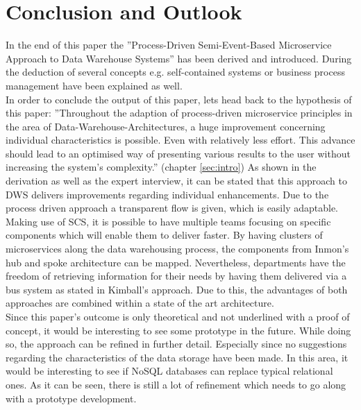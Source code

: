 \section{Conclusion and Outlook}
\label{sec:conclusion}
In the end of this paper the ''Process-Driven Semi-Event-Based Microservice Approach to Data Warehouse Systems'' has been derived and introduced. During the deduction of several concepts e.g. self-contained systems or business process management have been explained as well. \newline
\\
In order to conclude the output of this paper, lets head back to the hypothesis of this paper: ''Throughout the adaption of process-driven  microservice  principles  in  the  area  of  Data-Warehouse-Architectures,  a  huge improvement concerning individual characteristics is possible. Even with relatively less effort. This advance should lead to an optimised way of presenting various results to the user without increasing the system's complexity.'' (chapter \ref{sec:intro})
As shown in the derivation as well as the expert interview, it can be stated that this approach to DWS delivers improvements regarding individual enhancements. Due to the process driven approach a transparent flow is given, which is easily adaptable. Making use of SCS, it is possible to have multiple teams focusing on specific components which will enable them to deliver faster. By having clusters of microservices along the data warehousing process, the components from Inmon's hub and spoke architecture can be mapped. Nevertheless, departments have the freedom of retrieving information for their needs by having them delivered via a bus system as stated in Kimball's approach.\newline
Due to this, the advantages of both approaches are combined within a state of the art architecture. \newline
\\
Since this paper's outcome is only theoretical and not underlined with a proof of concept, it would be interesting to see some prototype in the future. While doing so, the approach can be refined in further detail. Especially since no suggestions regarding the characteristics of the data storage have been made. In this area, it would be interesting to see if NoSQL databases can replace typical relational ones. As it can be seen, there is still a lot of refinement which needs to go along with a prototype development.
